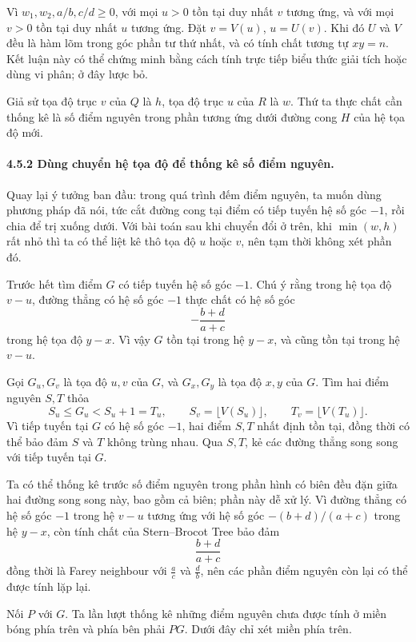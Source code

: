 \documentclass[11pt]{article}
\begin{document}
Vì \(w_1,w_2,a/b,c/d\ge 0\), với mọi \(u>0\) tồn tại duy nhất \(v\) tương ứng,
và với mọi \(v>0\) tồn tại duy nhất \(u\) tương ứng. Đặt
\(v=V(u)\), \(u=U(v)\). Khi đó \(U\) và \(V\) đều là hàm lõm trong góc phần tư
thứ nhất, và có tính chất tương tự \(xy=n\). Kết luận này có thể chứng minh
bằng cách tính trực tiếp biểu thức giải tích hoặc dùng vi phân; ở đây lược bỏ.

Giả sử tọa độ trục \(v\) của \(Q\) là \(h\), tọa độ trục \(u\) của \(R\) là
\(w\). Thứ ta thực chất cần thống kê là số điểm nguyên trong phần tương ứng
dưới đường cong \(H\) của hệ tọa độ mới.

\paragraph{4.5.2 Dùng chuyển hệ tọa độ để thống kê số điểm nguyên.}
Quay lại ý tưởng ban đầu: trong quá trình đếm điểm nguyên, ta muốn dùng phương
pháp đã nói, tức cắt đường cong tại điểm có tiếp tuyến hệ số góc \(-1\), rồi
chia để trị xuống dưới. Với bài toán sau khi chuyển đổi ở trên, khi
\(\min(w,h)\) rất nhỏ thì ta có thể liệt kê thô tọa độ \(u\) hoặc \(v\), nên
tạm thời không xét phần đó.

Trước hết tìm điểm \(G\) có tiếp tuyến hệ số góc \(-1\). Chú ý rằng trong hệ
tọa độ \(v-u\), đường thẳng có hệ số góc \(-1\) thực chất có hệ số góc
\[
  -\frac{b+d}{a+c}
\]
trong hệ tọa độ \(y-x\). Vì vậy \(G\) tồn tại trong hệ \(y-x\), và cũng tồn tại
trong hệ \(v-u\).

Gọi \(G_u,G_v\) là tọa độ \(u,v\) của \(G\), và \(G_x,G_y\) là tọa độ \(x,y\)
của \(G\). Tìm hai điểm nguyên \(S,T\) thỏa
\[
  S_u\le G_u<S_u+1=T_u,\qquad
  S_v=\lfloor V(S_u)\rfloor,\qquad
  T_v=\lfloor V(T_u)\rfloor.
\]
Vì tiếp tuyến tại \(G\) có hệ số góc \(-1\), hai điểm \(S,T\) nhất định tồn
tại, đồng thời có thể bảo đảm \(S\) và \(T\) không trùng nhau. Qua \(S,T\), kẻ
các đường thẳng song song với tiếp tuyến tại \(G\).

Ta có thể thống kê trước số điểm nguyên trong phần hình có biên đều đặn giữa
hai đường song song này, bao gồm cả biên; phần này dễ xử lý. Vì đường thẳng có
hệ số góc \(-1\) trong hệ \(v-u\) tương ứng với hệ số góc
\(-(b+d)/(a+c)\) trong hệ \(y-x\), còn tính chất của Stern--Brocot Tree bảo đảm
\[
  \frac{b+d}{a+c}
\]
đồng thời là Farey neighbour với \(\frac{a}{c}\) và \(\frac{d}{b}\), nên các
phần điểm nguyên còn lại có thể được tính lặp lại.

Nối \(P\) với \(G\). Ta lần lượt thống kê những điểm nguyên chưa được tính ở
miền bóng phía trên và phía bên phải \(PG\). Dưới đây chỉ xét miền phía trên.
\end{document}
